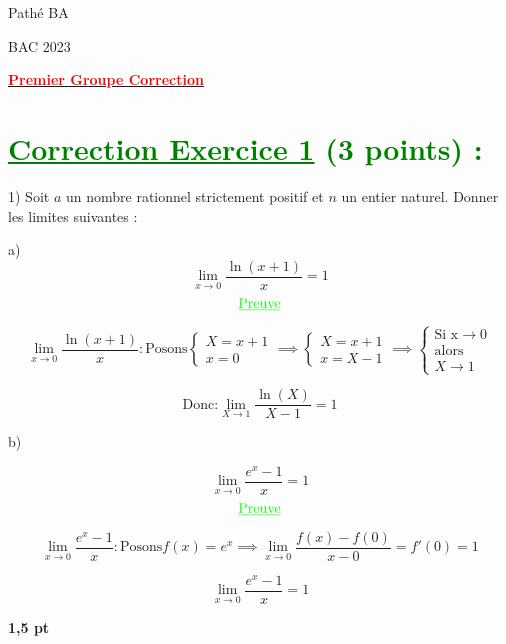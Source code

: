 \documentclass[12pt]{article}
\begin{document}
\begin{minipage}{0.8\textwidth}
	Pathé BA                          
\end{minipage}
\begin{minipage}{0.8\textwidth}
	BAC 2023
\end{minipage}

\begin{center}
\textbf{{\underline{\textcolor{red}{Premier Groupe Correction}}}}
\end{center}
\section*{\textcolor{green}{\underline{Correction Exercice 1} (3 points) :}}
1) Soit \(a\) un nombre rationnel strictement positif et \(n\) un entier naturel. Donner les limites suivantes :

a) 
\[ \lim_{x \to 0} \frac{\ln(x+1)}{x}=1 \]
\[ \textcolor{green}{\underline{\text{Preuve}}} \]

\[
\lim_{x \to 0} \frac{\ln(x+1)}{x}: \text{Posons}
\begin{cases}
X=x+1\\
x=0
\end{cases}\implies
\begin{cases}
X=x+1\\
x=X-1
\end{cases}\implies
\begin{cases}
\text{Si x}\rightarrow 0\\ \text{alors }\\ X\rightarrow 1
\end{cases}
\]

\[ \text{Donc:}\lim_{X \to 1} \frac{\ln(X)}{X-1}=1 \]

b)

\[
 \lim_{x \to 0} \frac{e^x - 1}{x}=1 
\]
\[ \textcolor{green}{\underline{\text{Preuve}}} \]

\[
\lim_{x \to 0} \frac{e^x - 1}{x}: \text{Posons}
f(x)=e^{x}\implies
\lim_{x \to 0} \frac{f(x) - f(0)}{x-0}=f'(0)=1
\]

\[
 \lim_{x \to 0} \frac{e^x - 1}{x}=1 
\]


\textbf{1,5 pt}

\end{document}
